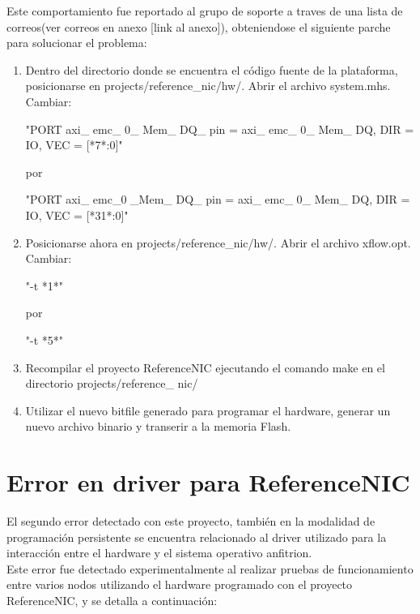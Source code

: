 Este comportamiento fue reportado al grupo de soporte a traves de una lista de correos(ver correos en anexo [link al anexo]), obteniendose el siguiente parche para solucionar el problema:

\begin{enumerate}
\item Dentro del directorio donde se encuentra el c\'odigo fuente de la plataforma, posicionarse en 
	  projects/reference\_nic/hw/. Abrir el archivo system.mhs.\\
	  Cambiar:
\begin{center}
	"PORT axi\_ emc\_ 0\_ Mem\_ DQ\_ pin = axi\_ emc\_ 0\_ Mem\_ DQ, DIR = IO, VEC = [*7*:0]"
\end{center}
por
\begin{center}
"PORT axi\_ emc\_0 \_Mem\_ DQ\_ pin = axi\_ emc\_ 0\_ Mem\_ DQ, DIR = IO, VEC = [*31*:0]"
\end{center}

\item Posicionarse ahora en projects/reference\_nic/hw/. Abrir el archivo xflow.opt.\\
	  Cambiar:
\begin{center}
"-t *1*"
\end{center}
por
\begin{center}
"-t *5*"
\end{center}

\item Recompilar el proyecto ReferenceNIC ejecutando el comando make en el directorio projects/reference\_ nic/

\item Utilizar el nuevo bitfile generado para programar el hardware, generar un nuevo archivo binario y transerir a la memoria Flash.
\end{enumerate}

\section*{Error en driver para ReferenceNIC}
El segundo error detectado con este proyecto, tambi\'en en la modalidad de programaci\'on persistente  se encuentra relacionado al driver utilizado para la interacci\'on entre el hardware y el sistema operativo anfitrion.\\

Este error fue detectado experimentalmente al realizar pruebas de funcionamiento entre varios nodos utilizando el hardware programado con el proyecto ReferenceNIC, y se detalla a continuaci\'on:

